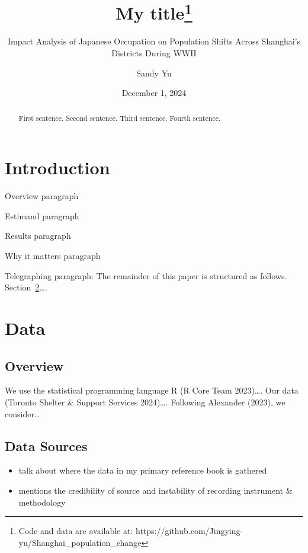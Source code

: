 \documentclass[
  letterpaper,
  DIV=11,
  numbers=noendperiod]{scrartcl}
\title{My title\thanks{Code and data are available at:
https://github.com/Jingying-yu/Shanghai\_population\_change}}
\subtitle{Impact Analysis of Japanese Occupation on Population Shifts
Across Shanghai's Districts During WWII}
\author{Sandy Yu}
\date{December 1, 2024}
\providecommand{\tightlist}{%
  \setlength{\itemsep}{0pt}\setlength{\parskip}{0pt}}\usepackage{longtable,booktabs,array}
\begin{document}
\maketitle
\begin{abstract}
First sentence. Second sentence. Third sentence. Fourth sentence.
\end{abstract}
\ifdefined\Shaded\renewenvironment{Shaded}{\begin{tcolorbox}[enhanced, boxrule=0pt, borderline west={3pt}{0pt}{shadecolor}, frame hidden, breakable, sharp corners, interior hidden]}{\end{tcolorbox}}\fi

\hypertarget{introduction}{%
\section{Introduction}\label{introduction}}

Overview paragraph

Estimand paragraph

Results paragraph

Why it matters paragraph

Telegraphing paragraph: The remainder of this paper is structured as
follows. Section~\ref{sec-data}\ldots.

\hypertarget{sec-data}{%
\section{Data}\label{sec-data}}

\hypertarget{overview}{%
\subsection{Overview}\label{overview}}

We use the statistical programming language R (R Core Team 2023)\ldots.
Our data (Toronto Shelter \& Support Services 2024)\ldots. Following
Alexander (2023), we consider\ldots{}

\hypertarget{data-sources}{%
\subsection{Data Sources}\label{data-sources}}

\begin{itemize}
\tightlist
\item
  talk about where the data in my primary reference book is gathered
\item
  mentions the credibility of source and instability of recording
  instrument \& methodology
\end{itemize}
\end{document}
